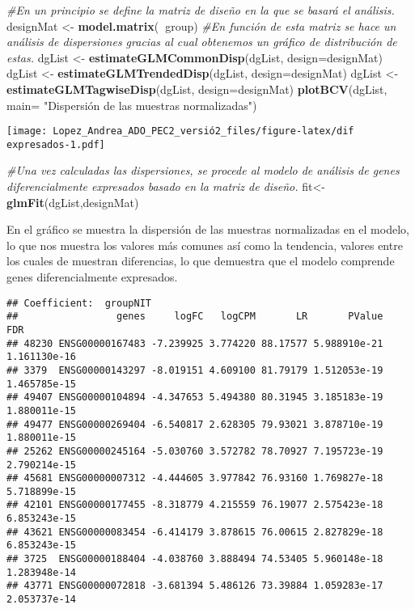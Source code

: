 \documentclass[
]{article}
\newenvironment{Shaded}{\begin{snugshade}}{\end{snugshade}}
\newcommand{\CommentTok}[1]{\textcolor[rgb]{0.56,0.35,0.01}{\textit{#1}}}
\newcommand{\DataTypeTok}[1]{\textcolor[rgb]{0.13,0.29,0.53}{#1}}
\newcommand{\KeywordTok}[1]{\textcolor[rgb]{0.13,0.29,0.53}{\textbf{#1}}}
\newcommand{\NormalTok}[1]{#1}
\newcommand{\OperatorTok}[1]{\textcolor[rgb]{0.81,0.36,0.00}{\textbf{#1}}}
\newcommand{\StringTok}[1]{\textcolor[rgb]{0.31,0.60,0.02}{#1}}
\begin{document}
\begin{Shaded}
\begin{Highlighting}[]
\CommentTok{#En un principio se define la matriz de diseño en la que se basará el análisis.}
\NormalTok{designMat <-}\StringTok{ }\KeywordTok{model.matrix}\NormalTok{(}\OperatorTok{~}\NormalTok{group)}
\CommentTok{#En función de esta matriz se hace un análisis de dispersiones gracias al cual obtenemos un gráfico de distribución de estas. }
\NormalTok{dgList <-}\StringTok{ }\KeywordTok{estimateGLMCommonDisp}\NormalTok{(dgList, }\DataTypeTok{design=}\NormalTok{designMat)}
\NormalTok{dgList <-}\StringTok{ }\KeywordTok{estimateGLMTrendedDisp}\NormalTok{(dgList, }\DataTypeTok{design=}\NormalTok{designMat)}
\NormalTok{dgList <-}\StringTok{ }\KeywordTok{estimateGLMTagwiseDisp}\NormalTok{(dgList, }\DataTypeTok{design=}\NormalTok{designMat)}
\KeywordTok{plotBCV}\NormalTok{(dgList, }\DataTypeTok{main=} \StringTok{"Dispersión de las muestras normalizadas"}\NormalTok{)}
\end{Highlighting}
\end{Shaded}

\texttt{[image: Lopez\_Andrea\_ADO\_PEC2\_versió2\_files/figure-latex/dif expresados-1.pdf]}

\begin{Shaded}
\begin{Highlighting}[]
\CommentTok{#Una vez calculadas las dispersiones, se procede al modelo de análisis de genes diferencialmente expresados basado en la matriz de diseño.}
\NormalTok{fit<-}\KeywordTok{glmFit}\NormalTok{(dgList,designMat)}
\end{Highlighting}
\end{Shaded}

En el gráfico se muestra la dispersión de las muestras normalizadas en
el modelo, lo que nos muestra los valores más comunes así como la
tendencia, valores entre los cuales de muestran diferencias, lo que
demuestra que el modelo comprende genes diferencialmente expresados.

\begin{verbatim}
## Coefficient:  groupNIT 
##                 genes     logFC   logCPM       LR       PValue          FDR
## 48230 ENSG00000167483 -7.239925 3.774220 88.17577 5.988910e-21 1.161130e-16
## 3379  ENSG00000143297 -8.019151 4.609100 81.79179 1.512053e-19 1.465785e-15
## 49407 ENSG00000104894 -4.347653 5.494380 80.31945 3.185183e-19 1.880011e-15
## 49477 ENSG00000269404 -6.540817 2.628305 79.93021 3.878710e-19 1.880011e-15
## 25262 ENSG00000245164 -5.030760 3.572782 78.70927 7.195723e-19 2.790214e-15
## 45681 ENSG00000007312 -4.444605 3.977842 76.93160 1.769827e-18 5.718899e-15
## 42101 ENSG00000177455 -8.318779 4.215559 76.19077 2.575423e-18 6.853243e-15
## 43621 ENSG00000083454 -6.414179 3.878615 76.00615 2.827829e-18 6.853243e-15
## 3725  ENSG00000188404 -4.038760 3.888494 74.53405 5.960148e-18 1.283948e-14
## 43771 ENSG00000072818 -3.681394 5.486126 73.39884 1.059283e-17 2.053737e-14
\end{verbatim}
\end{document}

